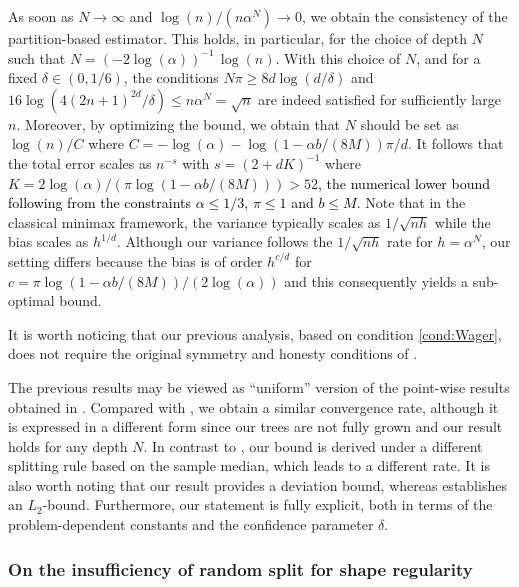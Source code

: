 \documentclass[paper=a4, fontsize=11pt]{scrartcl}
\newcommand{\rev}[1]{\textcolor{black}{#1}}
\begin{document}
As soon as $N \to \infty$ and $\log(n)/(n \alpha^N) \to 0$, we obtain the consistency of the partition-based estimator. This holds, in particular, for the choice of depth $N$ such that $N = (-2\log(\alpha))^{-1} \, \log(n)$. With this choice of $N$, and for a fixed $\delta \in (0,1/6)$, the conditions $N \pi \geq 8d \log(d/\delta)$ and $16 \log ( 4 (2n+1)^{2d} / \delta) \leq n \alpha^{N} = \sqrt{n} $ are indeed satisfied for sufficiently large $n$. Moreover, by optimizing the bound, we obtain that $N$  should be set as $\log(n)/C$ where $C = -\log(\alpha) - \log(1- \alpha b / (8M)) \pi/d$.
It follows that the total error scales as $n^{-s}$ with $s = {(2 + dK)^{-1}}$ where $K = {2 \log(\alpha)}/{(\pi \log\left( 1 - {\alpha b}/{(8M)} \right))} > 52$\rev{, the numerical lower bound following from the constraints $\alpha \leq 1/3$, $\pi \leq 1$ and $b \leq M$}. Note that in the classical minimax framework, the variance typically scales as $1/\sqrt{nh}$ while the bias scales as $h^{1/d}$. Although our variance follows the $1/\sqrt{nh}$ rate for $h=\alpha^N$, our setting differs because the bias is of order $h^{c/d}$ for $c = \pi \log(1-\alpha b/(8M)) / (2\log(\alpha))$ and this consequently yields a sub-optimal bound. 

It is worth noticing that our previous analysis, based on condition \ref{cond:Wager}, does not require the original symmetry and honesty conditions of \cite{wager2018estimation}. %

The previous results may be viewed as ``uniform'' version of the point-wise results obtained in \cite{wager2018estimation,duroux2018impact}. Compared with \cite{wager2018estimation}, we obtain a similar convergence rate, although it is expressed in a different form since our trees are not fully grown and our result holds for any depth $N$. In contrast to \cite{duroux2018impact}, our bound is derived under a different splitting rule based on the sample median, which leads to a different rate. It is also worth noting that our result provides a deviation bound, whereas \cite{duroux2018impact} establishes an $L_2$-bound. Furthermore, our statement is fully explicit, both in terms of the problem-dependent constants and the confidence parameter $\delta$.

\subsubsection{On the insufficiency of random split for shape regularity}\label{wager_sousopt}
\end{document}
